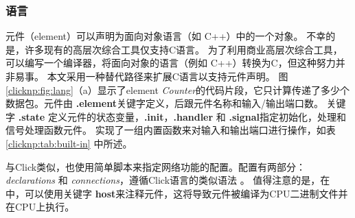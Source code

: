 \subsubsection{语言}

\name 元件（element）可以声明为面向对象语言（如 C++）中的一个对象。
不幸的是，许多现有的高层次综合工具仅支持C语言。
为了利用商业高层次综合工具，可以编写一个编译器，将面向对象的语言（例如 C++）转换为C，但这种努力并非易事。
本文采用一种替代路径来扩展C语言以支持元件声明。
图 \ref {clicknp:fig:lang}（a）显示了element \textit {Counter}的代码片段，它只计算传递了多少个数据包。元件由 \textbf {.element}关键字定义，后跟元件名称和输入/输出端口数。
关键字 \textbf {.state} 定义元件的状态变量，\textbf {.init}，\textbf {.handler} 和 \textbf {.signal}指定初始化，处理和信号处理函数元件。
实现了一组内置函数来对输入和输出端口进行操作，如表 \ref {clicknp:tab:built-in} 中所述。

与Click类似，\name 也使用简单脚本来指定网络功能的配置。配置有两部分：\textit {declarations} 和 \textit {connections}，遵循Click语言的类似语法 \cite {kohler2000click}。
值得注意的是，在 \name 中，可以使用关键字 \textbf {host}来注释元件，这将导致元件被编译为CPU二进制文件并在CPU上执行。

\begin{table}

\centering
\caption{\name\ 管道上的内置操作。}
\label{clicknp:tab:built-in}
\end{table}

